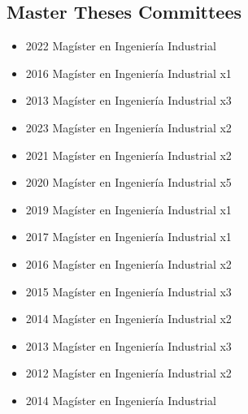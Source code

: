 \clearpage

\subsection{Master Theses Committees}


{\begin{itemize}
    \item 2022 Mag\'ister en Ingenier\'ia Industrial
\end{itemize}
}

{\begin{itemize}
    \item 2016 Mag\'ister en Ingenier\'ia Industrial x1
    \item 2013 Mag\'ister en Ingenier\'ia Industrial x3
\end{itemize}
}

{\begin{itemize}
    \item 2023 Mag\'ister en Ingenier\'ia Industrial x2
    \item 2021 Mag\'ister en Ingenier\'ia Industrial x2
    \item 2020 Mag\'ister en Ingenier\'ia Industrial x5
    \item 2019 Mag\'ister en Ingenier\'ia Industrial x1
    \item 2017 Mag\'ister en Ingenier\'ia Industrial x1
    \item 2016 Mag\'ister en Ingenier\'ia Industrial x2
    \item 2015 Mag\'ister en Ingenier\'ia Industrial x3
    \item 2014 Mag\'ister en Ingenier\'ia Industrial x2
    \item 2013 Mag\'ister en Ingenier\'ia Industrial x3
    \item 2012 Mag\'ister en Ingenier\'ia Industrial x2
\end{itemize}
}

{\begin{itemize}
    \item 2014 Mag\'ister en Ingenier\'ia Industrial
\end{itemize}
}


